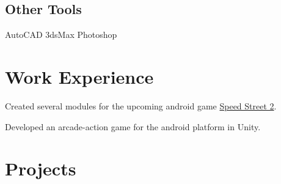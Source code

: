 \documentclass[a4paper]{resume}
\begin{document}
\begin{minipage}[t]{0.33\textwidth}
\sectionspace %

\subsection{Other Tools}
AutoCAD \textbullet{} 3dsMax \textbullet{} Photoshop


\end{minipage} %
\hfill
%
%
\begin{minipage}[t]{0.66\textwidth} %


\section{Work Experience}


\vspace{\topsep} %
\begin{tightitemize}
\item Created several modules for the upcoming android game {\href{https://play.google.com/store/apps/details?id=com.firexit.speedstreet2VRdemo}{Speed Street 2}}.
\item Developed an arcade-action game for the android platform in Unity.
\end{tightitemize}

\sectionspace %


\section{Projects}



\end{minipage}
\end{document}
